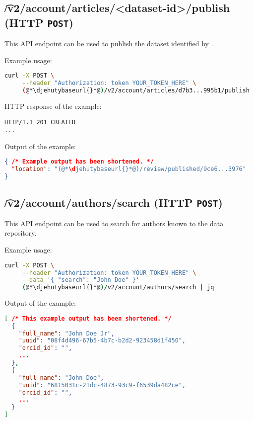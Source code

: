 \subsection{\t{/v2/account/articles/<dataset-id>/publish} (HTTP \texttt{POST})}

  This API endpoint can be used to publish the dataset identified by
  .


  Example usage:
\begin{lstlisting}[language=bash]
curl -X POST \
     --header "Authorization: token YOUR_TOKEN_HERE" \
     (@*\djehutybaseurl{}*@)/v2/account/articles/d7b3...995b1/publish | jq
\end{lstlisting}

  HTTP response of the example:
\begin{lstlisting}
HTTP/1.1 201 CREATED
...
\end{lstlisting}

  Output of the example:
\begin{lstlisting}[language=JSON]
{ /* Example output has been shortened. */
  "location": "(@*\djehutybaseurl{}*@)/review/published/9ce6...3976"
}
\end{lstlisting}

\subsection{\t{/v2/account/authors/search} (HTTP \texttt{POST})}

  This API endpoint can be used to search for authors known to the data
  repository.

  Example usage:
\begin{lstlisting}[language=bash]
curl -X POST \
     --header "Authorization: token YOUR_TOKEN_HERE" \
     --data '{ "search": "John Doe" }'
     (@*\djehutybaseurl{}*@)/v2/account/authors/search | jq
\end{lstlisting}

  Output of the example:
\begin{lstlisting}[language=JSON]
[ /* This example output has been shortened. */
  {
    "full_name": "John Doe Jr",
    "uuid": "08f4d496-67b5-4b7c-b2d2-923458d1f450",
    "orcid_id": "",
    ...
  },
  {
    "full_name": "John Doe",
    "uuid": "6815031c-21dc-4873-93c9-f6539da482ce",
    "orcid_id": "",
    ...
  }
]
\end{lstlisting}

